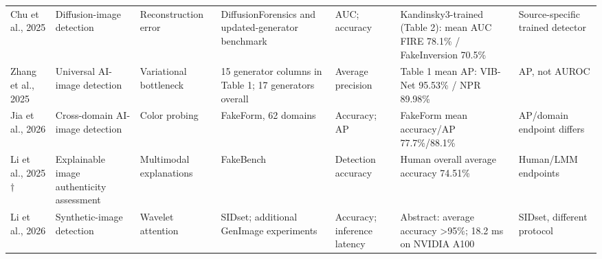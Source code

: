 \begin{table}[t]
\begin{tabularx}{\textwidth}
{}\cite{p6} Chu et al., 2025 & Diffusion-image detection & Reconstruction error & DiffusionForensics and updated-generator benchmark & AUC; accuracy & Kandinsky3-trained (Table 2): mean AUC FIRE 78.1\% / FakeInversion 70.5\% & Source-specific trained detector\\
{}\cite{p7} Zhang et al., 2025 & Universal AI-image detection & Variational bottleneck & 15 generator columns in Table 1; 17 generators overall & Average precision & Table 1 mean AP: VIB-Net 95.53\% / NPR 89.98\% & AP, not AUROC\\
{}\cite{p8} Jia et al., 2026 & Cross-domain AI-image detection & Color probing & FakeForm, 62 domains & Accuracy; AP & FakeForm mean accuracy/AP 77.7\%/88.1\% & AP/domain endpoint differs\\
{}\cite{p12} Li et al., 2025$\dagger$ & Explainable image authenticity assessment & Multimodal explanations & FakeBench & Detection accuracy & Human overall average accuracy 74.51\% & Human/LMM endpoints\\
{}\cite{p14} Li et al., 2026 & Synthetic-image detection & Wavelet attention & SIDset; additional GenImage experiments & Accuracy; inference latency & Abstract: average accuracy >95\%; 18.2 ms on NVIDIA A100 & SIDset, different protocol\\
\bottomrule\end{tabularx}
\end{table}